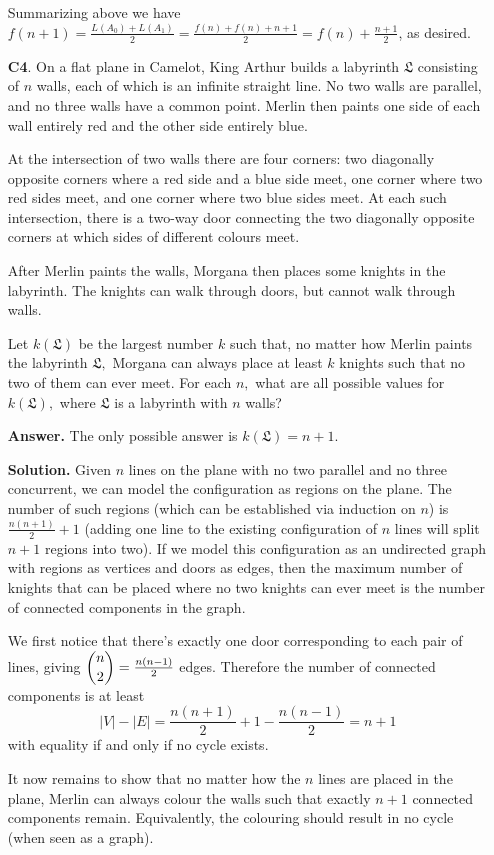 \documentclass[11pt,a4paper]{article}
\begin{document}
\begin{enumerate}
	Summarizing above we have $f(n+1)=\frac{L(A_0)+L(A_1)}{2}=\frac{f(n)+f(n)+n+1}{2}=f(n)+\frac{n+1}{2}$, as desired. 
	
	\item [\textbf{C4}.] On a flat plane in Camelot, King Arthur builds a labyrinth $\mathfrak{L}$ consisting of $n$ walls, each of which is an infinite straight line. No two walls are parallel, and no three walls have a common point. Merlin then paints one side of each wall entirely red and the other side entirely blue.
	
	At the intersection of two walls there are four corners: two diagonally opposite corners where a red side and a blue side meet, one corner where two red sides meet, and one corner where two blue sides meet. At each such intersection, there is a two-way door connecting the two diagonally opposite corners at which sides of different colours meet.
	
	After Merlin paints the walls, Morgana then places some knights in the labyrinth. The knights can walk through doors, but cannot walk through walls.
	
	Let $k(\mathfrak{L})$ be the largest number $k$ such that, no matter how Merlin paints the labyrinth $\mathfrak{L},$ Morgana can always place at least $k$ knights such that no two of them can ever meet. For each $n,$ what are all possible values for $k(\mathfrak{L}),$ where $\mathfrak{L}$ is a labyrinth with $n$ walls?
	
	\textbf{Answer.} The only possible answer is $k(\mathfrak{L})=n+1$. 
	
	\textbf{Solution.} Given $n$ lines on the plane with no two parallel and no three concurrent, we can model the configuration as regions on the plane. The number of such regions (which can be established via induction on $n$) is $\frac{n(n+1)}{2}+1$ (adding one line to the existing configuration of $n$ lines will split $n+1$ regions into two). If we model this configuration as an undirected graph with regions as vertices and doors as edges, then the maximum number of knights that can be placed where no two knights can ever meet is the number of connected components in the graph. 
	
	We first notice that there's exactly one door corresponding to each pair of lines, giving $\dbinom{n}{2}=\frac{n(n-1)}{2}$ edges. Therefore the number of connected components is at least 
	\[
	|V|-|E| = \frac{n(n+1)}{2}+1 - \frac{n(n-1)}{2} = n+1
	\]
	with equality if and only if no cycle exists. 
	
	It now remains to show that no matter how the $n$ lines are placed in the plane, Merlin can always colour the walls such that exactly $n+1$ connected components remain. Equivalently, the colouring should result in no cycle (when seen as a graph). 
	

\end{enumerate}
\end{document}
